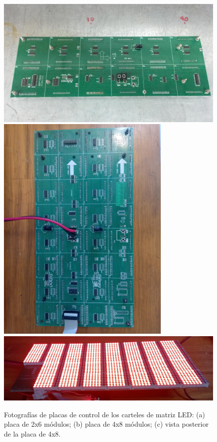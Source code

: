 \begin{figure}[ht]
	\centering
	\includegraphics[width=1\textwidth]{./Figures/cartel2x6.jpeg}
	\includegraphics[width=0.75\textwidth, angle=270]{./Figures/cartel4x8.jpg}\\
	\includegraphics[width=1\textwidth]{./Figures/cartelLedON.jpg}\\
	\caption{Fotografías de placas de control de los carteles de matriz LED: (a) placa de 2x6 módulos; (b) placa de 4x8 módulos; (c) vista posterior de la placa de 4x8.}
	\label{fig:picsDriverLED}
\end{figure}

